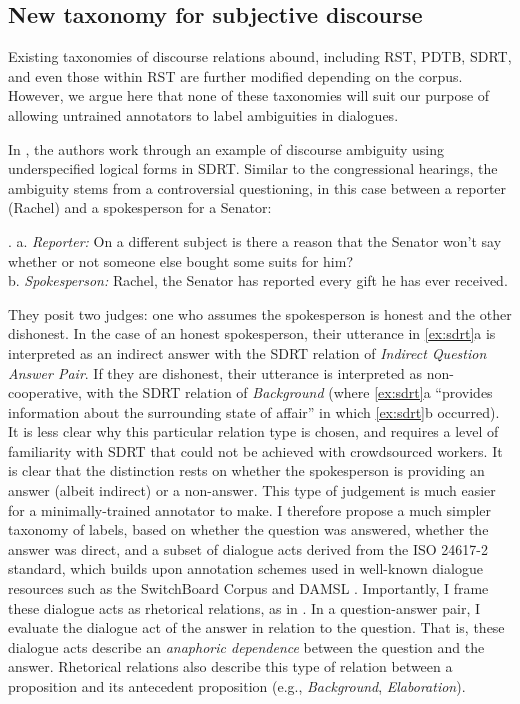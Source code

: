 \subsection{New taxonomy for subjective discourse}
Existing taxonomies of discourse relations abound, including RST, PDTB, SDRT, and even those within RST are further modified depending on the corpus. However, we argue here that none of these taxonomies will suit our purpose of allowing untrained annotators to label ambiguities in dialogues.

In \cite{Asher:2018}, the authors work through an example of discourse ambiguity using underspecified logical forms in SDRT. Similar to the congressional hearings, the ambiguity stems from a controversial questioning, in this case between a reporter (Rachel) and a spokesperson for a Senator:

\ex. a. \textit{Reporter:} On a different subject is there a reason that the Senator won’t say whether or not someone else bought some suits for him? \\
b. \textit{Spokesperson:} Rachel, the Senator has reported every gift he has ever received. \label{ex:sdrt}


They posit two judges: one who assumes the spokesperson is honest and the other dishonest. In the case of an honest spokesperson, their utterance in \ref{ex:sdrt}a is interpreted as an indirect answer with the SDRT relation of \emph{Indirect Question Answer Pair}. If they are dishonest, their utterance is interpreted as non-cooperative, with the SDRT relation of \emph{Background} (where \ref{ex:sdrt}a ``provides information about the surrounding state of affair'' in which \ref{ex:sdrt}b occurred). It is less clear why this particular relation type is chosen, and requires a level of familiarity with SDRT that could not be achieved with crowdsourced workers. It is clear that the distinction rests on whether the spokesperson is providing an answer (albeit indirect) or a non-answer. This type of judgement is much easier for a minimally-trained annotator to make. I therefore propose a much simpler taxonomy of labels, based on whether the question was answered, whether the answer was direct, and a subset of dialogue acts derived from the ISO 24617-2 standard, which builds upon annotation schemes used in well-known dialogue resources such as the SwitchBoard Corpus and DAMSL \cite{Bunt:2018}. Importantly, I frame these dialogue acts as rhetorical relations, as in \citet{Asher:2001}. In a question-answer pair, I evaluate the dialogue act of the answer in relation to the question. That is, these dialogue acts describe an \emph{anaphoric dependence} between the question and the answer. Rhetorical relations also describe this type of relation between a proposition and its antecedent proposition (e.g., \emph{Background}, \emph{Elaboration}).

